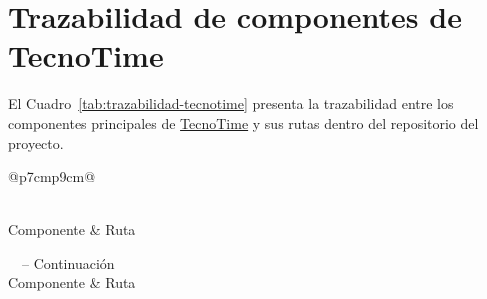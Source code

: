 \chapter{Trazabilidad de componentes de TecnoTime}\label{ann:trazabilidad-tecnotime}
El Cuadro~\ref{tab:trazabilidad-tecnotime} presenta la trazabilidad entre los componentes principales de \href{https://github.com/smith-3/TecnoTime}{TecnoTime} y sus rutas dentro del repositorio del proyecto.

\begin{longtable}{@{}p{7cm}p{9cm}@{}}
\caption{Trazabilidad de componentes y rutas del proyecto TecnoTime}\label{tab:trazabilidad-tecnotime}\\

\toprule
Componente & Ruta \\
\midrule
\endfirsthead

%
{\tablename\ \thetable\ -- Continuación} \\
\toprule
Componente & Ruta \\
\midrule
\endhead

\midrule
{} \\
\endfoot

\bottomrule
{}\\
\endlastfoot


\end{longtable}
